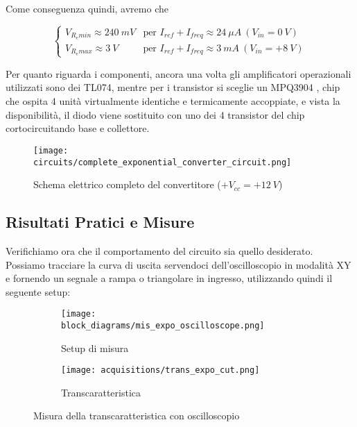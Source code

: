 Come conseguenza quindi, avremo che

\begin{equation}\label{vreminmax}
    \left\{
    \begin{array}{ll}
        V_{R_emin}\approx240\ mV & \text{per  } I_{ref}+I_{freq}\approx24\ \mu A\ (V_{in}=0\ V) \\
        V_{R_emax}\approx3\ V    & \text{per } I_{ref}+I_{freq}\approx3\ mA\ (V_{in}=+8\ V)
    \end{array}
    \right.
\end{equation}

Per quanto riguarda i componenti, ancora una volta gli amplificatori operazionali utilizzati
sono dei TL074, mentre per i transistor si sceglie un MPQ3904 \cite{mpq3904}, chip che
ospita 4 unità virtualmente identiche e termicamente accoppiate, e vista la disponibilità, il
diodo viene sostituito con uno dei 4 transistor del chip cortocircuitando base e collettore.

\begin{figure}[H]
    \centering
    \texttt{[image: circuits/complete\_exponential\_converter\_circuit.png]}
    \caption{Schema elettrico completo del convertitore ($+V_{cc}=+12\ V$)}
    \label{complete_exponential_converter_circuit}
\end{figure}


\subsection*{Risultati Pratici e Misure}


Verifichiamo ora che il comportamento del circuito sia quello desiderato. Possiamo tracciare
la curva di uscita servendoci dell'oscilloscopio in modalità XY e fornendo un segnale a rampa
o triangolare in ingresso, utilizzando quindi il seguente setup:

\begin{figure}[H]
    \centering

    \begin{subfigure}{.5\textwidth}
        \centering
        \texttt{[image: block\_diagrams/mis\_expo\_oscilloscope.png]}
        \caption{Setup di misura}
        \label{mis_expo_oscilloscope}
    \end{subfigure}%
    \begin{subfigure}{.5\textwidth}
        \centering
        \texttt{[image: acquisitions/trans\_expo\_cut.png]}
        \caption{Transcaratteristica}
        \label{expo_transcharacteristic}
    \end{subfigure}

    \caption{Misura della transcaratteristica con oscilloscopio}
\end{figure}

